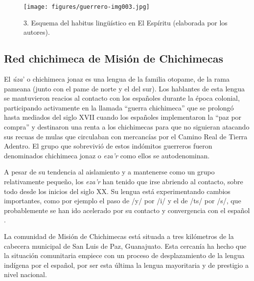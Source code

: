 \documentclass[output=paper]{../langscibook}
\begin{document}
\begin{figure}
\texttt{[image: figures/guerrero-img003.jpg]}
\caption{\label{fig:}3. Esquema del habitus lingüístico en El Espíritu (elaborada por los autores).}
\end{figure}



 \subsection{Red chichimeca de Misión de Chichimecas}



El \textit{úza}’ o chichimeca jonaz es una lengua de la familia otopame, de la rama pameana (junto con el pame de norte y el del sur). Los hablantes de esta lengua se mantuvieron reacios al contacto con los españoles durante la época colonial, participando activamente en la llamada “guerra chichimeca” que se prolongó hasta mediados del siglo XVII cuando los españoles implementaron la “paz por compra” y destinaron una renta a los chichimecas para que no siguieran atacando sus recuas de mulas que circulaban con mercancías por el Camino Real de Tierra Adentro. El grupo que sobrevivió de estos indómitos guerreros fueron denominados chichimeca jonaz o \textit{eza’r} como ellos se autodenominan.

A pesar de su tendencia al aislamiento y a mantenerse como un grupo relativamente pequeño, los \textit{eza’r} han tenido que irse abriendo al contacto, sobre todo desde los inicios del siglo XX. Su lengua está experimentando cambios importantes, como por ejemplo el paso de /y/ por /i/ y el de /ts/ por /s/, que probablemente se han ido acelerado por su contacto y convergencia con el español \citep{GuerreroEtAl2017}.

La comunidad de Misión de Chichimecas está situada a tres kilómetros de la cabecera municipal de San Luis de Paz, Guanajuato. Esta cercanía ha hecho que la situación comunitaria empiece con un proceso de desplazamiento de la lengua indígena por el español, por ser esta última la lengua mayoritaria y de prestigio a nivel nacional.
\end{document}
